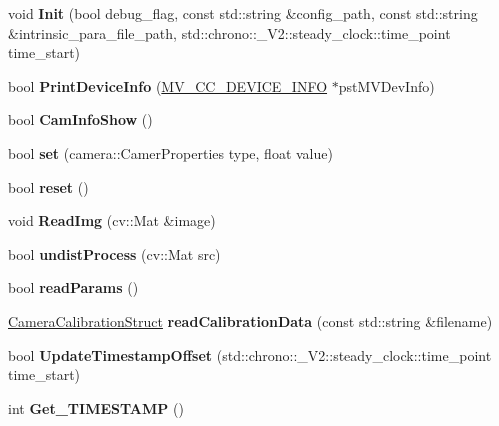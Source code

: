 \begin{DoxyCompactItemize}
\item 
\mbox{\label{classcamera_1_1_hik_camera_a0c74065cae919f94063e5b06d3453cb9}} 
void {\bfseries Init} (bool debug\+\_\+flag, const std\+::string \&config\+\_\+path, const std\+::string \&intrinsic\+\_\+para\+\_\+file\+\_\+path, std\+::chrono\+::\+\_\+\+V2\+::steady\+\_\+clock\+::time\+\_\+point time\+\_\+start)
\item 
\mbox{\label{classcamera_1_1_hik_camera_ac56bb385e077ac8248822f313f87cbb9}} 
bool {\bfseries Print\+Device\+Info} (\hyperlink{struct___m_v___c_c___d_e_v_i_c_e___i_n_f_o__}{M\+V\+\_\+\+C\+C\+\_\+\+D\+E\+V\+I\+C\+E\+\_\+\+I\+N\+FO} $\ast$pst\+M\+V\+Dev\+Info)
\item 
\mbox{\label{classcamera_1_1_hik_camera_a8c297c06d99d68b3315a8388b4e11134}} 
bool {\bfseries Cam\+Info\+Show} ()
\item 
\mbox{\label{classcamera_1_1_hik_camera_ac52caa313f88692b47b1a0d6eb4ab321}} 
bool {\bfseries set} (camera\+::\+Camer\+Properties type, float value)
\item 
\mbox{\label{classcamera_1_1_hik_camera_af08a74edafef667b8c89b21b2ac75d85}} 
bool {\bfseries reset} ()
\item 
\mbox{\label{classcamera_1_1_hik_camera_a6c4764cc5f40090140bfb980974f3fd8}} 
void {\bfseries Read\+Img} (cv\+::\+Mat \&image)
\item 
\mbox{\label{classcamera_1_1_hik_camera_a3382671edea040badf1b822f79842015}} 
bool {\bfseries undist\+Process} (cv\+::\+Mat src)
\item 
\mbox{\label{classcamera_1_1_hik_camera_afefc9042b72cbdb6bc4fd2f92621a77c}} 
bool {\bfseries read\+Params} ()
\item 
\mbox{\label{classcamera_1_1_hik_camera_a0aa4210627755a95e9723e1cc4811166}} 
\hyperlink{structcamera_1_1_hik_camera_1_1_camera_calibration_struct}{Camera\+Calibration\+Struct} {\bfseries read\+Calibration\+Data} (const std\+::string \&filename)
\item 
\mbox{\label{classcamera_1_1_hik_camera_ab800083a3191244de4f1bdb91f1573ed}} 
bool {\bfseries Update\+Timestamp\+Offset} (std\+::chrono\+::\+\_\+\+V2\+::steady\+\_\+clock\+::time\+\_\+point time\+\_\+start)
\item 
\mbox{\label{classcamera_1_1_hik_camera_a81754623c4ea7ddf7b078197a0f021c1}} 
int {\bfseries Get\+\_\+\+T\+I\+M\+E\+S\+T\+A\+MP} ()
\end{DoxyCompactItemize}
